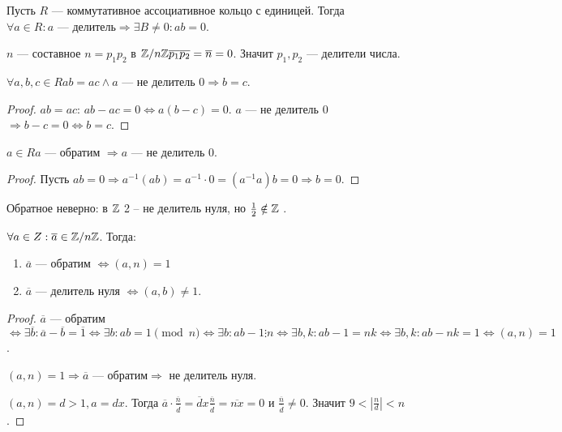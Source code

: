 \begin{definition}
    Пусть $R$ --- коммутативное ассоциативное кольцо с единицей. Тогда  $\forall a \in R: a\text{ --- делитель} \Rightarrow \exists B \neq 0: ab = 0$.
\end{definition}
\begin{example}
    $n$ --- составное  $n=p_1p_2$ в $\mathbb{Z} / n\mathbb{Z} \overline{p_1} \overline{p_2}=\overline{n}=0$. Значит $p_1,p_2$ --- делители числа.
\end{example}
\begin{lemma}
    $\forall a, b, c \in R ab = ac \land a\text{ --- не делитель 0} \Rightarrow b = c$. 
\end{lemma}
\begin{proof}
    $ab=ac$:  $ab - ac = 0 \iff a(b-c) = 0$.  $a$ --- не делитель 0  $\Rightarrow b-c=0 \iff b = c$.
\end{proof}
\begin{lemma}
    $a \in R a$ --- обратим $\Rightarrow a$ --- не делитель 0.
\end{lemma}
\begin{proof}
    Пусть $ab=0 \Rightarrow a^{-1}(ab) = a^{-1} \cdot 0 = (a^{-1}a)b = 0 \Rightarrow b =0$.
\end{proof}
\begin{remark}
    Обратное неверно: в $\mathbb{Z}$ 2 -- не делитель нуля, но  $\frac{1}{2} \notin \mathbb{Z}$ .
\end{remark}
\begin{theorem}
    $\forall a \in Z: \overline{a} \in \mathbb{Z} / n\mathbb{Z}$. Тогда:  
    \begin{enumerate}
        \item $\overline{a}$ --- обратим $\iff (a, n) = 1$
        \item  $\overline{a}$ --- делитель нуля $\iff (a, b) \neq 1$.
    \end{enumerate}
\end{theorem}
\begin{proof}
    $\overline{a}$ --- обратим  $\iff \exists \overline{b}: \overline{a} - \overline{b} = \overline{1} \iff \exists b: ab = 1 \pmod{n} \iff \exists b: ab - 1 \vdots n \iff \exists b, k: ab-1=nk \iff \exists b, k: ab-nk=1 \iff (a,n)  = 1$.

    $(a, n) = 1 \Rightarrow \overline{a}\text{ --- обратим} \Rightarrow$ не делитель нуля.

    $(a, n) = d > 1, a = dx$. Тогда  $\overline{a} \cdot \frac{\overline{n}}{\overline{d}} = \overline{d}x \frac{\overline{n}}{\overline{d}} = \overline{nx} = 0$ и $\frac{\overline{n}}{\overline{d}} \neq 0$. Значит  $9 < |\frac{n}{d}| < n$.
\end{proof}
